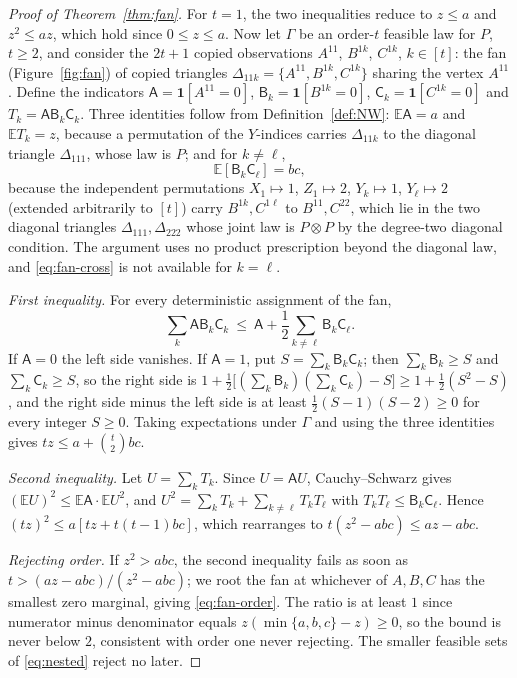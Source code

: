 \documentclass[11pt]{article}
\theoremstyle{plain}
\theoremstyle{definition}
\newcommand{\E}{\mathbb E}
\newcommand{\one}{\mathbf 1}
\begin{document}
\begin{proof}[Proof of Theorem~\ref{thm:fan}]
For $t=1$, the two inequalities reduce to $z\le a$ and $z^2\le az$, which hold since $0\le z\le a$. Now let $\Gamma$ be an order-$t$ feasible law for $P$, $t\ge2$, and consider the $2t+1$ copied observations $A^{11}$, $B^{1k}$, $C^{1k}$, $k\in[t]$: the fan (Figure~\ref{fig:fan}) of copied triangles $\Delta_{11k}=\{A^{11},B^{1k},C^{1k}\}$ sharing the vertex $A^{11}$. Define the indicators $\mathsf A=\one[A^{11}=0]$, $\mathsf B_k=\one[B^{1k}=0]$, $\mathsf C_k=\one[C^{1k}=0]$ and $T_k=\mathsf A\mathsf B_k\mathsf C_k$. Three identities follow from Definition~\ref{def:NW}: $\E\mathsf A=a$ and $\E T_k=z$, because a permutation of the $Y$-indices carries $\Delta_{11k}$ to the diagonal triangle $\Delta_{111}$, whose law is $P$; and for $k\ne\ell$,
\begin{equation}\label{eq:fan-cross}
\E[\mathsf B_k\mathsf C_\ell]=bc ,
\end{equation}
because the independent permutations $X_1\mapsto1$, $Z_1\mapsto2$, $Y_k\mapsto1$, $Y_\ell\mapsto2$ (extended arbitrarily to $[t]$) carry $B^{1k},C^{1\ell}$ to $B^{11},C^{22}$, which lie in the two diagonal triangles $\Delta_{111},\Delta_{222}$ whose joint law is $P\otimes P$ by the degree-two diagonal condition. The argument uses no product prescription beyond the diagonal law, and \eqref{eq:fan-cross} is not available for $k=\ell$.

\emph{First inequality.} For every deterministic assignment of the fan,
\begin{equation}\label{eq:fan-pointwise}
\sum_{k}\mathsf A\mathsf B_k\mathsf C_k\ \le\ \mathsf A+\frac12\sum_{k\ne\ell}\mathsf B_k\mathsf C_\ell .
\end{equation}
If $\mathsf A=0$ the left side vanishes. If $\mathsf A=1$, put $S=\sum_k\mathsf B_k\mathsf C_k$; then $\sum_k\mathsf B_k\ge S$ and $\sum_k\mathsf C_k\ge S$, so the right side is $1+\tfrac12\bigl[(\sum_k\mathsf B_k)(\sum_k\mathsf C_k)-S\bigr]\ge1+\tfrac12(S^2-S)$, and the right side minus the left side is at least $\tfrac12(S-1)(S-2)\ge0$ for every integer $S\ge0$. Taking expectations under $\Gamma$ and using the three identities gives $tz\le a+\binom t2bc$.

\emph{Second inequality.} Let $U=\sum_kT_k$. Since $U=\mathsf AU$, Cauchy--Schwarz gives $(\E U)^2\le\E\mathsf A\cdot\E U^2$, and $U^2=\sum_kT_k+\sum_{k\ne\ell}T_kT_\ell$ with $T_kT_\ell\le\mathsf B_k\mathsf C_\ell$. Hence $(tz)^2\le a[tz+t(t-1)bc]$, which rearranges to $t(z^2-abc)\le az-abc$.

\emph{Rejecting order.} If $z^2>abc$, the second inequality fails as soon as $t>(az-abc)/(z^2-abc)$; we root the fan at whichever of $A,B,C$ has the smallest zero marginal, giving \eqref{eq:fan-order}. The ratio is at least $1$ since numerator minus denominator equals $z(\min\{a,b,c\}-z)\ge0$, so the bound is never below $2$, consistent with order one never rejecting. The smaller feasible sets of \eqref{eq:nested} reject no later.
\end{proof}
\end{document}
